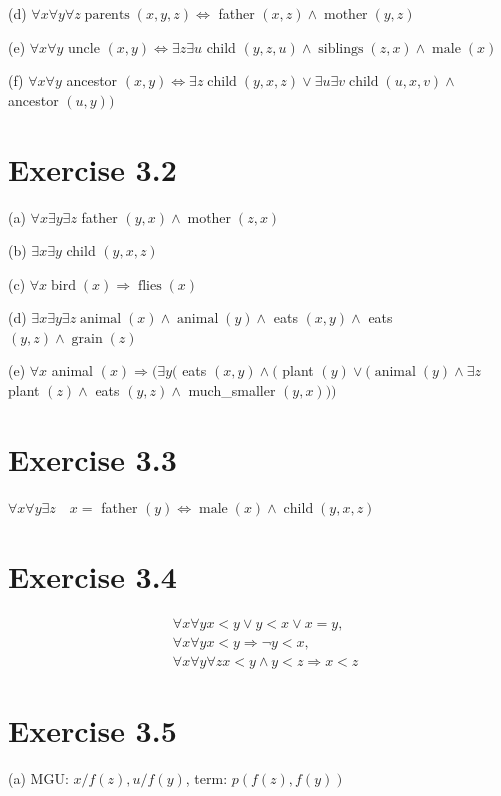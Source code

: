 \documentclass[10pt]{book}
\begin{document}
(d) $\forall x \forall y \forall z \operatorname{parents}(x, y, z) \Leftrightarrow$ father $(x, z) \wedge \operatorname{mother}(y, z)$

(e) $\forall x \forall y$ uncle $(x, y) \Leftrightarrow \exists z \exists u$ child $(y, z, u) \wedge \operatorname{siblings}(z, x) \wedge \operatorname{male}(x)$

(f) $\forall x \forall y$ ancestor $(x, y) \Leftrightarrow \exists z \operatorname{child}(y, x, z) \vee \exists u \exists v \operatorname{child}(u, x, v) \wedge$ ancestor $(u, y))$

\section{Exercise 3.2}
(a) $\forall x \exists y \exists z$ father $(y, x) \wedge \operatorname{mother}(z, x)$

(b) $\exists x \exists y$ child $(y, x, z)$

(c) $\forall x \operatorname{bird}(x) \Rightarrow \operatorname{flies}(x)$

(d) $\exists x \exists y \exists z \operatorname{animal}(x) \wedge \operatorname{animal}(y) \wedge$ eats $(x, y) \wedge$ eats $(y, z) \wedge \operatorname{grain}(z)$

(e) $\forall x$ animal $(x) \Rightarrow(\exists y($ eats $(x, y) \wedge($ plant $(y) \vee(\operatorname{animal}(y) \wedge \exists z$ plant $(z) \wedge$ eats $(y, z) \wedge$ much\_smaller $(y, x)))$

\section{Exercise 3.3}
$\forall x \forall y \exists z \quad x=$ father $(y) \Leftrightarrow \operatorname{male}(x) \wedge \operatorname{child}(y, x, z)$

\section{Exercise 3.4}
$$
\begin{aligned}
& \forall x \forall y x<y \vee y<x \vee x=y, \\
& \forall x \forall y x<y \Rightarrow \neg y<x, \\
& \forall x \forall y \forall z x<y \wedge y<z \Rightarrow x<z
\end{aligned}
$$

\section{Exercise 3.5}
(a) MGU: $x / f(z), u / f(y)$, term: $p(f(z), f(y))$
\end{document}
